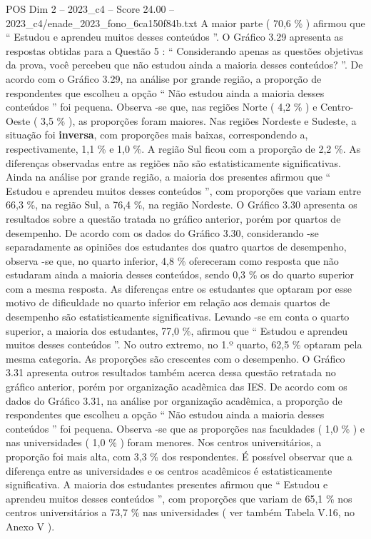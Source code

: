 \begin{textsample}{POS Dim 2 – 2023\_c4 – Score 24.00 – 2023\_c4/enade\_2023\_fono\_6ca150f84b.txt}
A maior parte ( 70,6 \% ) afirmou que “ Estudou e aprendeu muitos desses conteúdos ”.
O Gráfico 3.29 apresenta as respostas obtidas para a Questão 5 : “ Considerando apenas as questões objetivas da prova, você percebeu que não estudou ainda a maioria desses conteúdos? ”.
De acordo com o Gráfico 3.29, na análise por grande região, a proporção de respondentes que escolheu a opção “ Não estudou ainda a maioria desses conteúdos ” foi pequena.
Observa -se que, nas regiões Norte ( 4,2 \% ) e Centro-Oeste ( 3,5 \% ), as proporções foram maiores.
Nas regiões Nordeste e Sudeste, a situação foi \textbf{inversa}, com proporções mais baixas, correspondendo a, respectivamente, 1,1 \% e 1,0 \%.
A região Sul ficou com a proporção de 2,2 \%.
As diferenças observadas entre as regiões não são estatisticamente significativas.
Ainda na análise por grande região, a maioria dos presentes afirmou que “ Estudou e aprendeu muitos desses conteúdos ”, com proporções que variam entre 66,3 \%, na região Sul, a 76,4 \%, na região Nordeste.
O Gráfico 3.30 apresenta os resultados sobre a questão tratada no gráfico anterior, porém por quartos de desempenho.
De acordo com os dados do Gráfico 3.30, considerando -se separadamente as opiniões dos estudantes dos quatro quartos de desempenho, observa -se que, no quarto inferior, 4,8 \% ofereceram como resposta que não estudaram ainda a maioria desses conteúdos, sendo 0,3 \% os do quarto superior com a mesma resposta.
As diferenças entre os estudantes que optaram por esse motivo de dificuldade no quarto inferior em relação aos demais quartos de desempenho são estatisticamente significativas.
Levando -se em conta o quarto superior, a maioria dos estudantes, 77,0 \%, afirmou que “ Estudou e aprendeu muitos desses conteúdos ”.
No outro extremo, no 1.º quarto, 62,5 \% optaram pela mesma categoria.
As proporções são crescentes com o desempenho.
O Gráfico 3.31 apresenta outros resultados também acerca dessa questão retratada no gráfico anterior, porém por organização acadêmica das IES.
De acordo com os dados do Gráfico 3.31, na análise por organização acadêmica, a proporção de respondentes que escolheu a opção “ Não estudou ainda a maioria desses conteúdos ” foi pequena.
Observa -se que as proporções nas faculdades ( 1,0 \% ) e nas universidades ( 1,0 \% ) foram menores.
Nos centros universitários, a proporção foi mais alta, com 3,3 \% dos respondentes.
É possível observar que a diferença entre as universidades e os centros acadêmicos é estatisticamente significativa.
A maioria dos estudantes presentes afirmou que “ Estudou e aprendeu muitos desses conteúdos ”, com proporções que variam de 65,1 \% nos centros universitários a 73,7 \% nas universidades ( ver também Tabela V.16, no Anexo V ).

\end{textsample}
